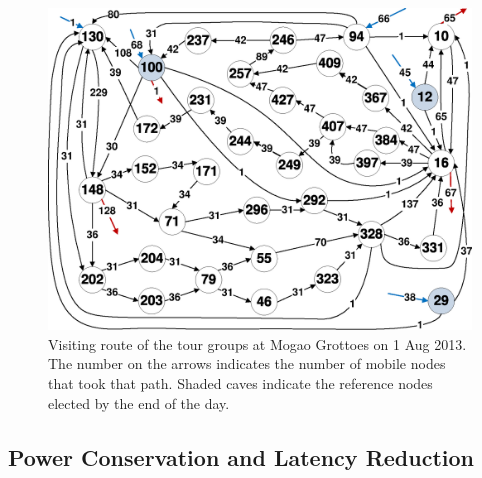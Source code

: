 \documentclass[twoside,twocolumn]{article}
\begin{document}
\begin{figure}[t]
    \centering
    \includegraphics[scale=0.30]{static/path1}
    \caption{Visiting route of the tour groups at Mogao Grottoes on 1
             Aug 2013.  The number on the arrows indicates the number of mobile
             nodes that took that path.  Shaded caves indicate the reference
             nodes elected by the end of the day.}
    \label{fig:trace}
\end{figure}

\subsection{Power Conservation and Latency Reduction}
\end{document}
